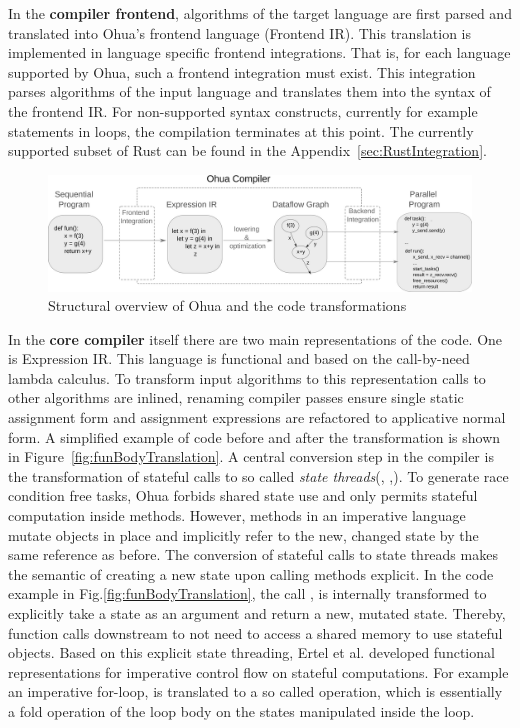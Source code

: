 In the \textbf{compiler frontend}, algorithms of the target language are first parsed and translated into Ohua's frontend language (Frontend IR). This translation is implemented in language specific frontend integrations. That is, for each language supported by Ohua, such a frontend integration must exist. This integration parses algorithms of the input language and translates them into the syntax of the frontend IR. For non-supported syntax constructs, currently for example  statements in loops, the compilation terminates at this point. The currently supported subset of Rust can be found in the Appendix~\ref{sec:RustIntegration}.

\begin{figure}[H]
    \centering
    \includegraphics[scale= 0.36]{figures/ohua_fine_with_channels.png}
    \caption{Structural overview of Ohua and the code transformations}
    \label{fig:ohua_fine}
\end{figure}

In the \textbf{core compiler} itself there are two main representations of the code. One is Expression IR. This language is functional and based on the call-by-need lambda calculus. To transform input algorithms to this representation 
calls to other algorithms are inlined, renaming compiler passes ensure single static assignment form and assignment expressions are refactored to applicative normal form. A simplified example of code before and after the transformation is shown in Figure~\ref{fig:funBodyTranslation}. A central conversion step in the compiler is the transformation of stateful calls to so called \emph{state threads}(\cite{wadler1992essence}, \cite{launchbury1994lazy},\cite{ertel2019stclang}). To generate race condition free tasks, Ohua forbids shared state use and only permits stateful computation inside methods. However, methods in an imperative language mutate objects in place and implicitly refer to the new, changed state by the same reference as before. The conversion of stateful calls to state threads makes the semantic of creating a new state upon calling methods explicit. In the code example in Fig.\ref{fig:funBodyTranslation}, the call , is internally transformed to explicitly take a state as an argument and return a new, mutated state. Thereby, function calls downstream to not need to access a shared memory to use stateful objects. Based on this explicit state threading, Ertel et al. \cite{ertel2019stclang, ertel2018supporting} developed functional representations for imperative control flow on stateful computations. For example an imperative for-loop, is translated to a so called  operation, which is essentially a fold operation of the loop body on the states manipulated inside the loop. 


